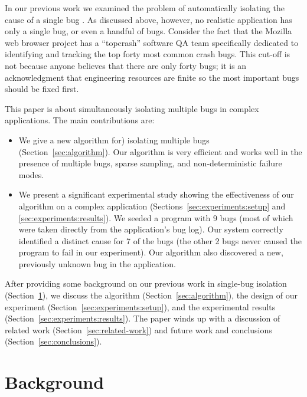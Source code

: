 \documentclass{sig-alternate}
\begin{document}
In our previous work we examined the problem of automatically
isolating the cause of a single bug
\cite{PLDI`03*141,Zheng:2003:SDSP}.  As discussed above, however, no
realistic application has only a single bug, or even a handful of
bugs.  Consider the fact that the Mozilla web browser project has a
``topcrash'' software QA team specifically dedicated to identifying
and tracking the top forty most common crash bugs.  This cut-off is
not because anyone believes that there are only forty bugs; it is an
acknowledgment that engineering resources are finite so the most
important bugs should be fixed first.

This paper is about simultaneously isolating multiple bugs in complex
applications.  The main contributions are:

\begin{itemize}

\item We give a new algorithm for) isolating multiple bugs
(Section~\ref{sec:algorithm}).  Our algorithm is very efficient and works well in the
presence of multiple bugs, sparse sampling, and non-deterministic failure
modes.

\item We present a significant experimental study showing the
effectiveness of our algorithm on a complex application
(Sections~\ref{sec:experiments:setup} and
\ref{sec:experiments:results}).  We seeded a program with 9 bugs (most
of which were taken directly from the application's bug log).  Our
system correctly identified a distinct cause for 7 of the bugs (the
other 2 bugs never caused the program to fail in our experiment).
Our algorithm also discovered a new, previously unknown bug in the
application.

\end{itemize}

After providing some background on our previous work in single-bug
isolation (Section~\ref{sec:background}), we discuss the algorithm (Section~\ref{sec:algorithm}),
the design of our experiment (Section~\ref{sec:experiments:setup}), and
the experimental results (Section~\ref{sec:experiments:results}).
The paper winds up with a discussion of related work (Section~\ref{sec:related-work})
and future work and conclusions (Section~\ref{sec:conclusions}).

\section{Background}
\label{sec:background}
\end{document}
